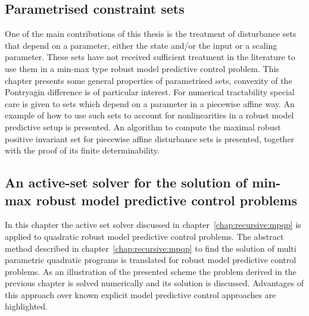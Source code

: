 \documentclass[a4paper,12pt]{scrartcl}
\begin{document}
\subsection{Parametrised constraint sets}\label{chap:mrpi:sets}
One of the main contributions of this thesis is the treatment of disturbance sets that depend on a parameter,
either the state and/or the input or a scaling parameter.
%
These sets have not received sufficient treatment in the literature to use them in a min-max type robust
model predictive control problem.
%
This chapter presents some general properties of parametrised sets, convexity of the Pontryagin difference
is of particular interest.
%
For numerical tractability special care is given to sets which depend on a parameter in a piecewise affine way.
%
An example of how to use such sets to account for nonlinearities in a robust model predictive setup is presented.
%
An algorithm to compute the maximal robust positive invariant set for piecewise affine disturbance sets is presented,
together with the proof of its finite determinability.

\subsection{An active-set solver for the solution of min-max robust model predictive control problems}
In this chapter the active set solver discussed in chapter~\ref{chap:recursive:mpqp} is applied to quadratic
robust model predictive control problems.
%
The abstract method described in chapter~\ref{chap:recursive:mpqp} to find the solution of multi parametric quadratic
programs is translated for robust model predictive control problems.
%
As an illustration of the presented scheme the problem derived in the previous chapter is solved numerically and its solution
is discussed.
%
Advantages of this approach over known explicit model predictive control approaches are highlighted.
\end{document}
